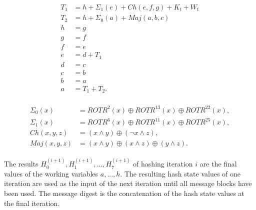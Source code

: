 \begin{align}
    \begin{split}
        T_1 &= h + \Sigma_1(e) + Ch(e,f,g) + K_{t} + W_{t} \\
        T_2 &= h + \Sigma_0(a) + Maj(a,b,c) \\
        h &= g \\
        g &= f \\
        f &= e \\
        e &= d + T_1 \\
        d &= c \\
        c &= b \\
        b &= a \\
        a &= T_1 + T_2.
    \end{split}
\label{eq:hash_iter}
\end{align}

\begin{align}
    \begin{split}
        \Sigma_{0}(x) &= ROTR^{2}(x) \oplus ROTR^{13}(x) \oplus ROTR^{22}(x), \\
        \Sigma_{1}(x) &= ROTR^{6}(x) \oplus ROTR^{11}(x) \oplus ROTR^{25}(x), \\
        Ch(x,y,z) &= (x \land y) \oplus ( \neg x \land z), \\
        Maj(x,y,z) &= (x \land y) \oplus (x \land z) \oplus (y \land z).
    \end{split}
\label{eq:Sigma_Ch_Maj}
\end{align}

The results $H_{0}^{(i+1)}, H_{1}^{(i+1)},..., H_{7}^{(i+1)}$ of hashing
iteration $i$ are the final values of the working variables $a,..., h$.
The resulting hash state values of one iteration are used as the input of the
next iteration until all message blocks have been used. The message digest is
the concatenation of the hash state values at the final iteration.

